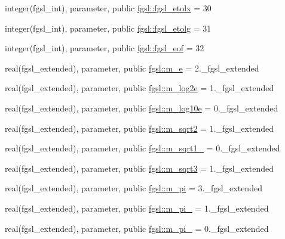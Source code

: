 \begin{DoxyCompactItemize}
\item 
integer(fgsl\+\_\+int), parameter, public \hyperlink{namespacefgsl_ad136d96d34c4ac68f155224650a94e4c}{fgsl\+::fgsl\+\_\+etolx} = 30
\item 
integer(fgsl\+\_\+int), parameter, public \hyperlink{namespacefgsl_a12d84e3678cb637e43f1a7a888558110}{fgsl\+::fgsl\+\_\+etolg} = 31
\item 
integer(fgsl\+\_\+int), parameter, public \hyperlink{namespacefgsl_a9641f79a70406a1c9f483f01fdb1ccfa}{fgsl\+::fgsl\+\_\+eof} = 32
\item 
real(fgsl\+\_\+extended), parameter, public \hyperlink{namespacefgsl_abd883826f3a31d832e0746f37ac56cff}{fgsl\+::m\+\_\+e} = 2.\+\_\+fgsl\+\_\+extended
\item 
real(fgsl\+\_\+extended), parameter, public \hyperlink{namespacefgsl_a93d2e5a473874e31cbcf8de12963fd8e}{fgsl\+::m\+\_\+log2e} = 1.\+\_\+fgsl\+\_\+extended
\item 
real(fgsl\+\_\+extended), parameter, public \hyperlink{namespacefgsl_a64dfb3018d641c61312823bf56c85023}{fgsl\+::m\+\_\+log10e} = 0.\+\_\+fgsl\+\_\+extended
\item 
real(fgsl\+\_\+extended), parameter, public \hyperlink{namespacefgsl_a7d0e2199519f7100527499e3c206fc31}{fgsl\+::m\+\_\+sqrt2} = 1.\+\_\+fgsl\+\_\+extended
\item 
real(fgsl\+\_\+extended), parameter, public \hyperlink{namespacefgsl_aa15c7774ec8561b9221b81138e50d715}{fgsl\+::m\+\_\+sqrt1\+\_} = 0.\+\_\+fgsl\+\_\+extended
\item 
real(fgsl\+\_\+extended), parameter, public \hyperlink{namespacefgsl_acdd93c47924b7382b9ab00728cc46b9f}{fgsl\+::m\+\_\+sqrt3} = 1.\+\_\+fgsl\+\_\+extended
\item 
real(fgsl\+\_\+extended), parameter, public \hyperlink{namespacefgsl_a8af1e390793c77a120b600e4844495dc}{fgsl\+::m\+\_\+pi} = 3.\+\_\+fgsl\+\_\+extended
\item 
real(fgsl\+\_\+extended), parameter, public \hyperlink{namespacefgsl_af8cd74655823aa30933d33b51ac35bbc}{fgsl\+::m\+\_\+pi\+\_} = 1.\+\_\+fgsl\+\_\+extended
\item 
real(fgsl\+\_\+extended), parameter, public \hyperlink{namespacefgsl_ac72cdbd05abd60541bd253d571673cf4}{fgsl\+::m\+\_\+pi\+\_} = 0.\+\_\+fgsl\+\_\+extended

\end{DoxyCompactItemize}
